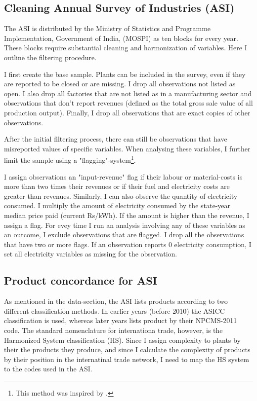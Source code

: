 \documentclass[11pt]{article}
\begin{document}
\begin{appendices}
\subsection{Cleaning Annual Survey of Industries (ASI)}%
\label{sub:cleaning_annual_survey_of_industries_asi}

The ASI is distributed by the Ministry of Statistics and Programme Implementation, Government of India, (MOSPI) as ten blocks for every year. These blocks require substantial cleaning and harmonization of variables. Here I outline the filtering procedure.

I first create the base sample. Plants can be included in the survey, even if they are reported to be closed or are missing. I drop all observations not listed as open. I also drop all factories that are not listed as in a manufacturing sector and observations that don't report revenues (defined as the total gross sale value of all production output). Finally, I drop all observations that are exact copies of other observations.

After the initial filtering process, there can still be observations that have misreported values of specific variables. When analysing these variables, I further limit the sample using a "flagging"-system\footnote{This method was inspired by \cite{allcott_how_2016}.}. 

I assign observations an "input-revenue" flag if their labour or material-costs is more than two times their revenues or if their fuel and electricity costs are greater than revenues. Similarly, I can also observe the quantity of electricity consumed. I multiply the amount of electricity consumed by the state-year median price paid (current Rs/kWh). If the amount is higher than the revenue, I assign a flag. For evey time I run an analysis involving any of these variables as an outcome, I exclude observations that are flagged. I drop all the observations that have two or more flags. If an observation reports 0 electricity consumption, I set all electricity variables as missing for the observation.

\subsection{Product concordance for ASI}%
\label{sub:product_concordance_asi}

As mentioned in the data-section, the ASI lists products according to two different classification methods. In earlier years (before 2010) the ASICC classification is used, whereas later years lists product by their NPCMS-2011 code. The standard nomenclature for internationa trade, however, is the Harmonized System classification (HS). Since I assign complexity to plants by their the products they produce, and since I calculate the complexity of products by their position in the internatinal trade network, I need to map the HS system to the codes used in the ASI.


\end{appendices}
\end{document}
